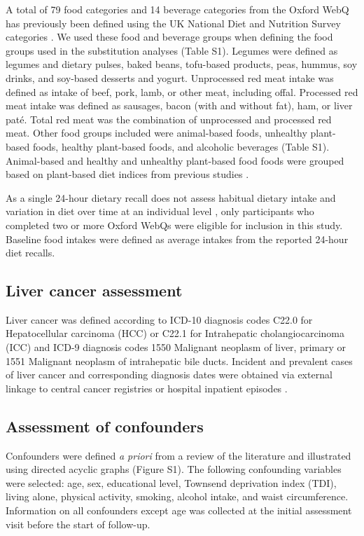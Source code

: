 \documentclass[nutrients,article,submit,moreauthors,pdftex]{Definitions/mdpi}
\begin{document}
A total of 79 food categories and 14 beverage categories from the Oxford
WebQ has previously been defined using the UK National Diet and
Nutrition Survey categories \citep{piernas2021}. We used these food and
beverage groups when defining the food groups used in the substitution
analyses (Table S1). Legumes were defined as legumes and dietary pulses,
baked beans, tofu-based products, peas, hummus, soy drinks, and
soy-based desserts and yogurt. Unprocessed red meat intake was defined
as intake of beef, pork, lamb, or other meat, including offal. Processed
red meat intake was defined as sausages, bacon (with and without fat),
ham, or liver paté. Total red meat was the combination of unprocessed
and processed red meat. Other food groups included were animal-based
foods, unhealthy plant-based foods, healthy plant-based foods, and
alcoholic beverages (Table S1). Animal-based and healthy and unhealthy
plant-based food foods were grouped based on plant-based diet indices
from previous studies \citep{Thompson2023, Heianza2021, Satija2017, Satija2016}.

As a single 24-hour dietary recall does not assess habitual dietary
intake and variation in diet over time at an individual level
\citep{thompson2013, gurinovic2017}, only participants who completed two or
more Oxford WebQs were eligible for inclusion in this study. Baseline
food intakes were defined as average intakes from the reported 24-hour
diet recalls.

\hypertarget{subsec3}{%
\subsection{Liver cancer assessment}\label{subsec3}}

Liver cancer was defined according to ICD-10 diagnosis codes C22.0 for
Hepatocellular carcinoma (HCC) or C22.1 for Intrahepatic
cholangiocarcinoma (ICC) and ICD-9 diagnosis codes 1550 Malignant
neoplasm of liver, primary or 1551 Malignant neoplasm of intrahepatic
bile ducts. Incident and prevalent cases of liver cancer and
corresponding diagnosis dates were obtained via external linkage to
central cancer registries or hospital inpatient episodes \citep{RN112, RN114}.

\hypertarget{subsec4}{%
\subsection{Assessment of confounders}\label{subsec4}}

Confounders were defined \emph{a priori} from a review of the literature and
illustrated using directed acyclic graphs (Figure S1). The following
confounding variables were selected: age, sex, educational level,
Townsend deprivation index (TDI), living alone, physical activity,
smoking, alcohol intake, and waist circumference. Information on all
confounders except age was collected at the initial assessment visit
before the start of follow-up.
\end{document}
